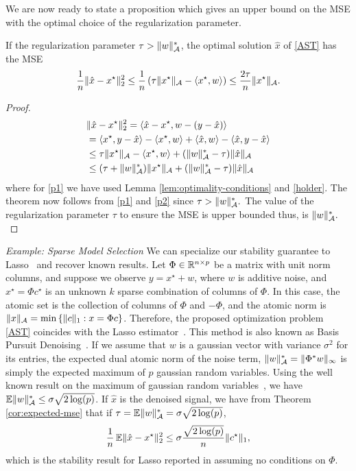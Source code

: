 We are now ready to state a proposition which gives an upper bound on the MSE
with the optimal choice of the regularization parameter.

\begin{prop}
\label{prop:main-result}

If the regularization parameter $\tau > \lVert w\rVert_{\mathcal{A}}^*$, the optimal solution
$\hat{x}$ of \eqref{AST} has the MSE
\begin{equation}\label{eq:slow-mse}
\frac{1}{n}\lVert\hat{x} - x^\star\rVert_2^2 \leq \frac{1}{n}\left(\tau \lVert x^\star\rVert_{\mathcal{A}} - \langle x^\star, w\rangle\right) \leq \frac{2\tau}{n}\lVert x^\star\rVert_{\mathcal{A}}.
\end{equation} 
\begin{proof}
\begin{align}
	&\lVert\hat{x} - x^\star\rVert_2^2 = \langle\hat{x}-x^\star, w-(y -\hat{x})\rangle         \label{expand}\\
	& = \langle x^\star, y-\hat{x}\rangle - \langle x^\star, w\rangle +\langle\hat{x}, w\rangle -\langle\hat{x}, y-\hat{x}\rangle\nonumber\\
	& \leq \tau\lVert x^\star\rVert_{\mathcal{A}} - \langle x^\star, w\rangle+ (\lVert w\rVert_{\mathcal{A}}^* -  \tau)\lVert\hat{x}\rVert_{\mathcal{A}}\label{p1}\\
	& \leq (\tau + \lVert w\rVert_{\mathcal{A}}^*)\lVert x^\star\rVert_{\mathcal{A}} + (\lVert w\rVert_{\mathcal{A}}^* - \tau)\lVert\hat{x}\rVert_{\mathcal{A}}\label{p2}
\end{align}
where for  \eqref{p1} we have used Lemma \ref{lem:optimality-conditions} and \eqref{holder}. 
The theorem now follows from \eqref{p1} and \eqref{p2} since $\tau
> \lVert w\rVert_{\mathcal{A}}^*.$ The value of the regularization parameter $\tau$ to ensure
the MSE is upper bounded thus, is $\lVert w\rVert_{\mathcal{A}}^*.$
\end{proof}
\end{prop}

\noindent\emph{Example: Sparse Model Selection} We can specialize our stability
guarantee to Lasso~\cite{tibshirani96} and recover known results. Let $\Phi \in
\mathbb{R}^{n \times p}$ be a matrix with unit norm columns, and suppose we observe
$y = x^\star + w$, where $w$ is additive noise, and $x^\star = \Phi
c^\star$ is an unknown $k$ sparse combination of columns of $\Phi$. In this
case, the atomic set is the collection of columns of $\Phi$ and $-\Phi$, and
the atomic norm is $\lVert x\rVert_{\mathcal{A}} = \min \left\{\lVert c\rVert_1: x = \Phi c\right\}$.
Therefore, the proposed optimization
problem \eqref{AST} coincides with the Lasso estimator~\cite{tibshirani96}.
This method is also known as Basis Pursuit Denoising~\cite{chen01}. If we
assume that $w$ is a gaussian vector with variance $\sigma^2$ for its entries,
the expected dual atomic norm of the noise term, $\lVert w\rVert_{\mathcal{A}}^* =
\lVert\Phi^*w\rVert_\infty$ is simply the expected maximum of $p$ gaussian random
variables. Using the well known result on the maximum of gaussian random
variables~\cite{lr76}, we have $\operatorname{\mathbb{E}}\lVert w\rVert_{\mathcal{A}}^* \leq \sigma \sqrt{2 \log(p)}$.
If $\hat{x}$ is the denoised signal, we have from Theorem
\ref{cor:expected-mse} that if $\tau = \operatorname{\mathbb{E}}\lVert w\rVert_{\mathcal{A}}^* = \sigma \sqrt{2
\log(p)}$, \[ \frac{1}{n}\operatorname{\mathbb{E}}\lVert\hat{x} - x^\star\rVert_2^2 \leq \sigma
\frac{\sqrt{2\log(p)} }{n} \lVert c^\star\rVert_1, \] which is the stability result
for Lasso reported in \cite{greenshtein04} assuming no conditions on $\Phi$.

